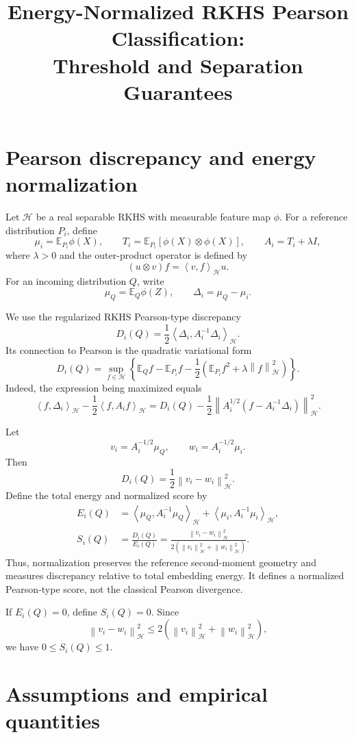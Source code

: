 \documentclass[11pt]{article}
\title{Energy-Normalized RKHS Pearson Classification:\\
Threshold and Separation Guarantees}
\author{}
\date{}
\newcommand{\HH}{\mathcal H}
\newcommand{\E}{\mathbb E}
\newcommand{\inner}[2]{\left\langle #1,#2\right\rangle_{\HH}}
\newcommand{\norm}[1]{\left\lVert #1\right\rVert_{\HH}}
\begin{document}
\maketitle

\section{Pearson discrepancy and energy normalization}

Let $\HH$ be a real separable RKHS with measurable feature
map $\phi$. For a reference distribution $P_i$, define
\[
\mu_i=\E_{P_i}\phi(X),
\qquad
T_i=\E_{P_i}[\phi(X)\otimes\phi(X)],
\qquad
A_i=T_i+\lambda I,
\]
where $\lambda>0$ and the outer-product operator is defined by
\[
(u\otimes v)f=\inner{v}{f}u.
\]
For an incoming distribution $Q$, write
\[
\mu_Q=\E_Q\phi(Z),
\qquad
\Delta_i=\mu_Q-\mu_i.
\]

We use the regularized RKHS Pearson-type discrepancy
\begin{equation}
D_i(Q)=\frac12\inner{\Delta_i}{A_i^{-1}\Delta_i}.
\label{eq:pearson}
\end{equation}
Its connection to Pearson is the quadratic variational form
\begin{equation}
D_i(Q)
=
\sup_{f\in\HH}
\left\{
\E_Q f-\E_{P_i}f
-\frac12\left(\E_{P_i}f^2+\lambda\norm{f}^2\right)
\right\}.
\label{eq:variational}
\end{equation}
Indeed, the expression being maximized equals
\[
\inner{f}{\Delta_i}-\frac12\inner{f}{A_i f}
=
D_i(Q)
-\frac12
\norm{A_i^{1/2}(f-A_i^{-1}\Delta_i)}^2.
\]

Let
\[
v_i=A_i^{-1/2}\mu_Q,
\qquad
w_i=A_i^{-1/2}\mu_i.
\]
Then
\[
D_i(Q)=\frac12\norm{v_i-w_i}^2.
\]
Define the total energy and normalized score by
\begin{align}
E_i(Q)
&=
\inner{\mu_Q}{A_i^{-1}\mu_Q}
+\inner{\mu_i}{A_i^{-1}\mu_i},
\label{eq:energy}
\\
S_i(Q)
&=
\frac{D_i(Q)}{E_i(Q)}
=
\frac{\norm{v_i-w_i}^2}
{2(\norm{v_i}^2+\norm{w_i}^2)}.
\label{eq:score}
\end{align}
Thus, normalization preserves the reference second-moment
geometry and measures discrepancy relative to total
embedding energy. It defines a normalized Pearson-type score,
not the classical Pearson divergence.

If $E_i(Q)=0$, define $S_i(Q)=0$.
Since
\[
\norm{v_i-w_i}^2
\le2(\norm{v_i}^2+\norm{w_i}^2),
\]
we have $0\le S_i(Q)\le1$.

\section{Assumptions and empirical quantities}
\end{document}
